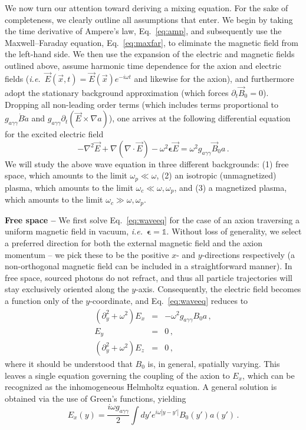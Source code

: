 \documentclass[twocolumn,superscriptaddress,floatfix,preprintnumbers,prd,nofootinbib,aps,10pt]{revtex4-2}
\renewcommand\({\left(}
\renewcommand\){\right)}
\renewcommand\[{\left[}
\renewcommand\]{\right]}
\newcommand\ie{{\it i.e.}~}
\begin{document}
We now turn our attention toward deriving a mixing equation. For the sake of completeness, we clearly outline all assumptions that enter. We begin by taking the time derivative of Ampere's law, Eq.~\ref{eq:amp}, and subsequently use the Maxwell–Faraday equation, Eq.~\ref{eq:maxfar}, to eliminate the magnetic field from the left-hand side. We then use the expansion of the electric and magnetic fields outlined above, assume harmonic time dependence for the axion and electric fields (\ie $\vec{E}(\vec{x},t) = \vec{E}(\vec{x}) e^{-i\omega t}$ and likewise for the axion), and furthermore adopt the stationary background approximation (which forces $\partial_t \vec{B}_0 = 0$). Dropping all non-leading order terms (which includes terms proportional to $g_{a\gamma\gamma} \dot{B} \dot{a}$ and $g_{a\gamma\gamma} \partial_t(\vec{E} \times \nabla a)$), one arrives at the following differential equation for the excited electric field~\cite{Hook:2018iia, Witte2021,millar2021axionphotonUPDATED,mcdonald2023axionphoton}
%
\begin{equation}\label{eq:waveeq}
    -\nabla^2 \vec{E} + \nabla (\nabla \cdot \vec{E}) - \omega^2 \boldsymbol\epsilon \vec{E} = \omega^2 g_{a\gamma\gamma} \vec{B}_0 a \, .
\end{equation}
%
We will study the above wave equation in three different backgrounds: (1) free space, which amounts to the limit $\omega_p \ll \omega$, (2) an isotropic (unmagnetized) plasma, which amounts to the limit $\omega_c \ll \omega, \omega_p$, and (3) a magnetized plasma, which amounts to the limit $\omega_c \gg \omega, \omega_p$. 

{\bf Free space -- }We first solve Eq.~\ref{eq:waveeq} for the case of an axion traversing a uniform magnetic field in vacuum, \ie $\boldsymbol\epsilon = \mathbb{1}$. Without loss of generality, we select a preferred direction for both the external magnetic field and the axion momentum -- we pick these to be the positive $x$- and $y$-directions respectively (a non-orthogonal magnetic field can be included in a straightforward manner). In free space, sourced photons do not refract, and thus all particle trajectories will stay exclusively oriented along the $y$-axis. Consequently, the electric field becomes a function only of the $y$-coordinate, and Eq.~\ref{eq:waveeq} reduces to
%
\begin{eqnarray}
    (\partial_y^2 + \omega^2) E_x &=& -\omega^2 g_{a\gamma\gamma} B_0 a \, , \label{eq:waveeq_free}\\
    E_y &=& 0 \, , \\
    (\partial_y^2 + \omega^2) E_z &=& 0  \, ,
\end{eqnarray}
%
where it should be understood that $B_0$ is, in general, spatially varying. This leaves a single equation governing the coupling of the axion to $E_x$, which can be recognized as the inhomogeneous Helmholtz equation. A general solution is obtained via the use of Green's functions, yielding 
%
\begin{equation}
    E_x(y) = \frac{i \omega g_{a\gamma\gamma}}{2} \int dy' e^{i \omega |y - y'|} B_0(y') a(y') \, .
\end{equation}
\end{document}
